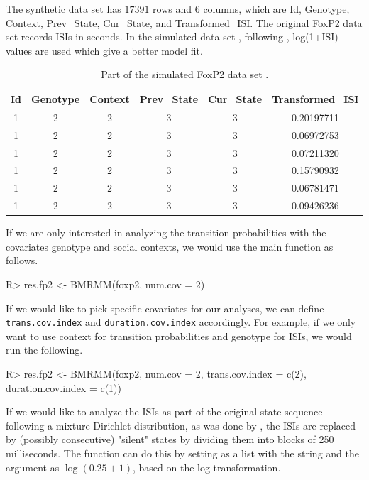 The  synthetic data set has $17391$ rows and $6$ columns, which are Id, Genotype, Context, Prev\_State, Cur\_State, and Transformed\_ISI. 
The original FoxP2 data set records ISIs in seconds. 
In the simulated data set , following \citet{wu2021bayesian}, log(1+ISI) values are used which give a better model fit. 


\begin{table}[h]
    \centering
    \begin{tabular}{cccccc}
    \toprule
Id & Genotype& Context &Prev\_State& Cur\_State    &    {Transformed\_ISI} \\\midrule
1     &   2     &  2      &    3     &    3 & 0.20197711\\
1     &   2     &  2      &    3     &    3 & 0.06972753\\
1     &   2     &  2      &    3     &    3 & 0.07211320\\
1     &   2     &  2      &    3     &    3 & 0.15790932\\
1     &   2     &  2      &    3     &    3 & 0.06781471\\
1     &   2     &  2      &    3     &    3 & 0.09426236\\\bottomrule
    \end{tabular}
    \caption{Part of the simulated FoxP2 data set .}
    \label{tab:foxp2}
\end{table}


If we are only interested in analyzing the transition probabilities with the covariates genotype and social contexts, we would use the main function as follows.

\begin{example}
R> res.fp2 <- BMRMM(foxp2, num.cov = 2)
\end{example}


If we would like to pick specific covariates for our analyses, we can define \texttt{trans.cov.index} and \texttt{duration.cov.index} accordingly. 
For example, if we only want to use context for transition probabilities and genotype for ISIs, we would run the following.


\begin{example}
R> res.fp2 <- BMRMM(foxp2, num.cov = 2, 
                    trans.cov.index = c(2), duration.cov.index = c(1))
\end{example}


If we would like to analyze the ISIs as part of the original state sequence following a mixture Dirichlet distribution, as was done by \citet{sarkar2018bayesian}, 
the ISIs are replaced by (possibly consecutive) "silent" states by dividing them into blocks of 250 milliseconds.
The  function can do this by setting  as a list with the string  and the argument  as $\log(0.25+1)$, based on the log transformation.



